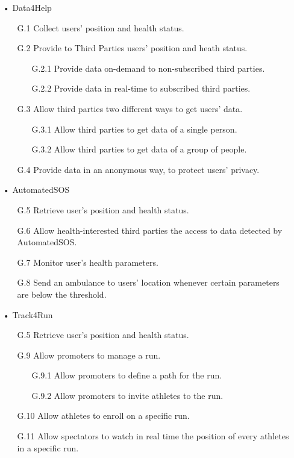 \begin{enumerate}
\item[•] {\Large Data4Help}
	\begin{enumerate}
		\item [G.1] Collect users' position and health status.
		\item [G.2] Provide to Third Parties users' position and heath status.
		\begin{enumerate}
		\item [G.2.1] Provide data on-demand to non-subscribed third parties.
		\item [G.2.2] Provide data in real-time to subscribed third parties.
		\end{enumerate}
		\item [G.3] Allow third parties two different ways to get users' data.
		\begin{enumerate}
		\item [G.3.1] Allow third parties to get data of a single person.
		\item [G.3.2] Allow third parties to get data of a group of people.
		\end{enumerate}
		\item [G.4] Provide data in an anonymous way, to protect users' privacy.
	\end{enumerate}
	
\item[•] {\Large AutomatedSOS}
	\begin{enumerate}
		\item [G.5] Retrieve user's position and health status.
		\item [G.6] Allow health-interested third parties the access to data detected by AutomatedSOS.
		\item [G.7] Monitor user's health parameters.
		\item [G.8] Send an ambulance to users' location whenever certain parameters are below the threshold.
		\end{enumerate}
	
\item[•] {\Large Track4Run}	
	\begin{enumerate}
		\item [G.5] Retrieve user's position and health status.
		\item [G.9] Allow promoters to manage a run.
		\begin{enumerate}
		\item [G.9.1] Allow promoters to define a path for the run. 
		\item [G.9.2] Allow promoters to invite athletes to the run. 
		\end{enumerate}
		\item [G.10] Allow athletes to enroll on a specific run.
		\item [G.11] Allow spectators to watch in real time the position of every athletes in a specific run.
	\end{enumerate}
\end{enumerate}

